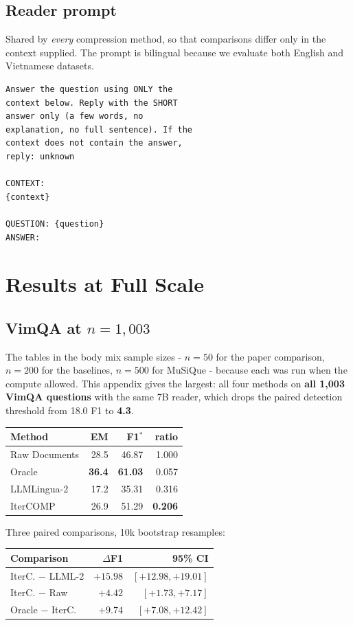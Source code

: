 \documentclass[11pt]{article}
\begin{document}
\subsection{Reader prompt}
Shared by \emph{every} compression method, so that comparisons differ only in the
context supplied. The prompt is bilingual because we evaluate both English and
Vietnamese datasets.
{\small\begin{verbatim}
Answer the question using ONLY the
context below. Reply with the SHORT
answer only (a few words, no
explanation, no full sentence). If the
context does not contain the answer,
reply: unknown

CONTEXT:
{context}

QUESTION: {question}
ANSWER:
\end{verbatim}}

\section{Results at Full Scale}

\subsection{VimQA at $n=1{,}003$}
\label{app:full}

The tables in the body mix sample sizes - $n=50$ for the paper comparison,
$n=200$ for the baselines, $n=500$ for MuSiQue - because each was run when the
compute allowed. This appendix gives the largest: all four methods on
\textbf{all 1,003 VimQA questions}
with the same 7B reader, which drops the paired detection threshold from 18.0 F1
to \textbf{4.3}.

\begin{center}
\begin{tabular}{lrrr}
\toprule
Method & EM & F1$^*$ & ratio \\
\midrule
Raw Documents & 28.5 & 46.87 & 1.000 \\
Oracle & \textbf{36.4} & \textbf{61.03} & 0.057 \\
LLMLingua-2 & 17.2 & 35.31 & 0.316 \\
IterCOMP & 26.9 & 51.29 & \textbf{0.206} \\
\bottomrule
\end{tabular}
\end{center}

Three paired comparisons, 10k bootstrap resamples:

\begin{center}
\small
\setlength{\tabcolsep}{4pt}
\begin{tabular}{lrr}
\toprule
Comparison & $\Delta$F1 & 95\% CI \\
\midrule
IterC. $-$ LLML-2 & $+15.98$ & $[+12.98, +19.01]$ \\
IterC. $-$ Raw & $+4.42$ & $[+1.73, +7.17]$ \\
Oracle $-$ IterC. & $+9.74$ & $[+7.08, +12.42]$ \\
\bottomrule
\end{tabular}
\end{center}
\end{document}
